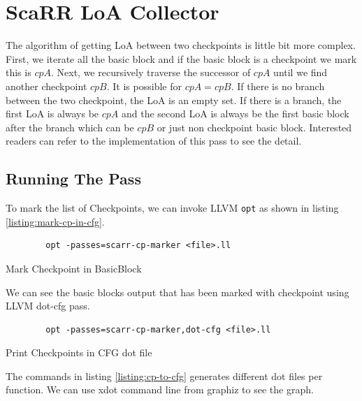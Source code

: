 \section{ScaRR LoA Collector} \label{sec:scarr-loa-collector}

The algorithm of getting LoA between two checkpoints is little bit more complex. First, we iterate all the basic block and if the basic block is a checkpoint we mark this is $cpA$. Next, we recursively traverse the successor of $cpA$ until we find another checkpoint $cpB$. It is possible for $cpA = cpB$. If there is no branch between the two checkpoint, the LoA is an empty set. If there is a branch, the first LoA is always be $cpA$ and the second LoA is always be the first basic block after the branch \textemdash{} which can be $cpB$ or just non checkpoint basic block. Interested readers can refer to the implementation of this pass to see the detail.

\subsection{Running The Pass}

To mark the list of Checkpoints, we can invoke LLVM \texttt{opt} as shown in listing \ref{listing:mark-cp-in-cfg}.

\begin{listing}[htbp]
    \begin{verbatim}
        opt -passes=scarr-cp-marker <file>.ll
    \end{verbatim}
    \caption{Mark Checkpoint in BasicBlock}    
    \label{listing:mark-cp-in-cfg}
\end{listing}

We can see the basic blocks output that has been marked with checkpoint using LLVM dot-cfg pass.

\begin{listing}[htbp]
    \begin{verbatim}
        opt -passes=scarr-cp-marker,dot-cfg <file>.ll
    \end{verbatim}
    \caption{Print Checkpoints in CFG dot file}    
    \label{listing:cp-to-cfg}
\end{listing}

The commands in listing \ref{listing:cp-to-cfg} generates different dot files per function. We can use xdot command line from graphiz to see the graph. 

